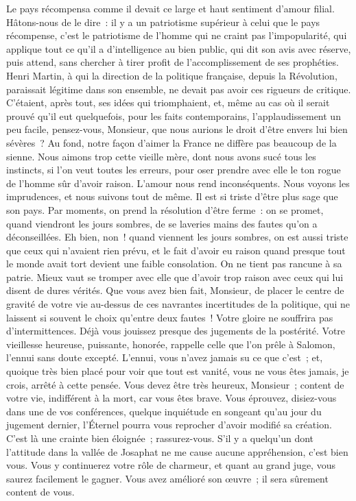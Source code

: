 \documentclass[french,twoside]{book} %
\newcommand\persName[1]{#1}
\begin{document}
Le pays récompensa comme il devait ce large et haut sentiment d’amour filial. Hâtons-nous de le dire : il y a un patriotisme supérieur à celui que le pays récompense, c’est le patriotisme de l’homme qui ne craint pas l’impopularité, qui applique tout ce qu’il a d’intelligence au bien public, qui dit son avis avec réserve, puis attend, sans chercher à tirer profit de l’accomplissement de ses prophéties. {\persName Henri Martin}, à qui la direction de la politique française, depuis la Révolution, paraissait légitime dans son ensemble, ne devait pas avoir ces rigueurs de critique. C’étaient, après tout, ses idées qui triomphaient, et, même au cas où il serait prouvé qu’il eut quelquefois, pour les faits contemporains, l’applaudissement un peu facile, pensez-vous, Monsieur, que nous aurions le droit d’être envers lui bien sévères ? Au fond, notre façon d’aimer la France ne diffère pas beaucoup de la sienne. Nous aimons trop cette vieille mère, dont nous avons sucé tous les instincts, si l’on veut toutes les erreurs, pour oser prendre avec elle le ton rogue de l’homme sûr d’avoir raison. L’amour nous rend inconséquents. Nous voyons les imprudences, et nous suivons tout de même. Il est si triste d’être plus sage que son pays. Par moments, on prend la résolution d’être ferme : on se promet, quand viendront les jours sombres, de se laveries mains des fautes qu’on a déconseillées. Eh bien, non ! quand viennent les jours sombres, on est aussi triste que ceux qui n’avaient rien prévu, et le fait d’avoir eu raison quand presque tout le monde avait tort devient une faible consolation. On ne tient pas rancune à sa patrie. Mieux vaut se tromper avec elle que d’avoir trop raison avec ceux qui lui disent de dures vérités. Que vous avez bien fait, Monsieur, de placer le centre de gravité de votre vie au-dessus de ces navrantes incertitudes de la politique, qui ne laissent si souvent le choix qu’entre deux fautes ! Votre gloire ne souffrira pas d’intermittences. Déjà vous jouissez presque des jugements de la postérité. Votre vieillesse heureuse, puissante, honorée, rappelle celle que l’on prêle à Salomon, l’ennui sans doute excepté. L’ennui, vous n’avez jamais su ce que c’est ; et, quoique très bien placé pour voir que tout est vanité, vous ne vous êtes jamais, je crois, arrêté à cette pensée. Vous devez être très heureux, Monsieur ; content de votre vie, indifférent à la mort, car vous êtes brave. Vous éprouvez, disiez-vous dans une de vos conférences, quelque inquiétude en songeant qu’au jour du jugement dernier, l’{\persName Éternel} pourra vous reprocher d’avoir modifié sa création. C’est là une crainte bien éloignée ; rassurez-vous. S’il y a quelqu’un dont l’attitude dans la vallée de Josaphat ne me cause aucune appréhension, c’est bien vous. Vous y continuerez votre rôle de charmeur, et quant au grand juge, vous saurez facilement le gagner. Vous avez amélioré son œuvre ; il sera sûrement content de vous.\par
\end{document}
